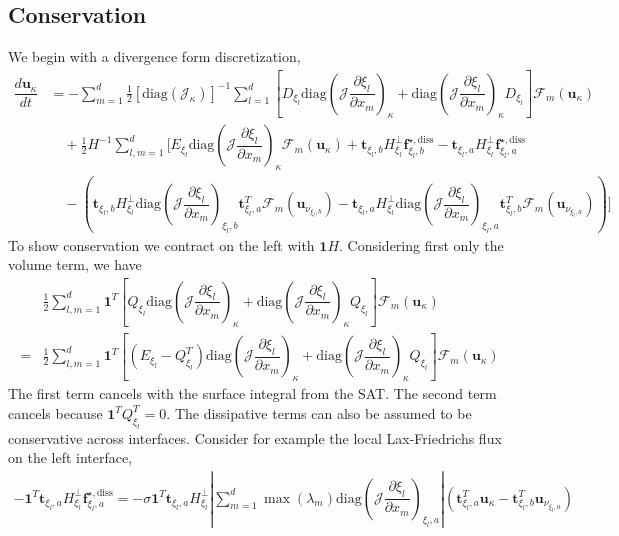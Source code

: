 \documentclass[12pt,a4paper]{article}
\newcommand{\pder}[2][]{\dfrac{\partial #1}{\partial #2}} %
\newcommand{\der}[2][]{\dfrac{d #1}{d #2}} %
\newcommand{\fn}[1]{\mathcal{#1}} %
\newcommand{\fnb}[1]{\bm{\mathcal{#1}}} %
\begin{document}
\subsection{Conservation}

We begin with a divergence form discretization,
\begin{align*}
\der[\bm{u}_\kappa]{t} &= - \sum_{m=1}^d \frac{1}{2} \left[ \text{diag}\left( \fn{J}_\kappa \right) \right]^{-1} \sum_{l=1}^d \left[ D_{\xi_l} \text{diag} \left( \fn{J} \pder[\xi_l]{x_m} \right)_\kappa + \text{diag} \left( \fn{J} \pder[\xi_l]{x_m} \right)_\kappa  D_{\xi_l} \right]  \fnb{F}_m \left( \bm{u}_\kappa \right) \\
& \quad + \frac{1}{2} H^{-1} \sum_{l,m = 1}^d \Bigg[ E_{\xi_l} \text{diag} \left( \fn{J} \pder[\xi_l]{x_m} \right)_\kappa \fnb{F}_m ( \bm{u}_\kappa) +  \bm{t}_{\xi_l,b} H^{\bot}_{\xi_l} \bm{f}^{\star , \text{diss}}_{\xi_l,b}  - \bm{t}_{\xi_l,a} H^{\bot}_{\xi_l} \bm{f}^{\star , \text{diss}}_{\xi_l,a}   \\
& \quad - \left( \bm{t}_{\xi_l,b} H^{\bot}_{\xi_l} \text{diag} \left( \fn{J} \pder[\xi_l]{x_m} \right)_{\xi_l,b} \bm{t}^T_{\xi_l,a}  \fnb{F}_m ( \bm{u}_{\nu_{\xi_l,b}} ) - \bm{t}_{\xi_l,a} H^{\bot}_{\xi_l} \text{diag} \left( \fn{J} \pder[\xi_l]{x_m} \right)_{\xi_l,a} \bm{t}_{\xi_l,b}^T  \fnb{F}_m ( \bm{u}_{\nu_{\xi_l,a}} ) \right) \Bigg]
\end{align*} 
To show conservation we contract on the left with $\bm{1} H$. Considering first only the volume term, we have
\begin{align*}
& \frac{1}{2} \sum_{l,m=1}^d \bm{1}^T  \left[ Q_{\xi_l} \text{diag} \left( \fn{J} \pder[\xi_l]{x_m} \right)_\kappa + \text{diag} \left( \fn{J} \pder[\xi_l]{x_m} \right)_\kappa  Q_{\xi_l} \right] \fnb{F}_m \left( \bm{u}_\kappa \right) \\
 = & \frac{1}{2} \sum_{l,m=1}^d \bm{1}^T  \left[ \left( E_{\xi_l} - Q_{\xi_l}^T \right) \text{diag} \left( \fn{J} \pder[\xi_l]{x_m} \right)_\kappa + \text{diag} \left( \fn{J} \pder[\xi_l]{x_m} \right)_\kappa  Q_{\xi_l} \right] \fnb{F}_m \left( \bm{u}_\kappa \right) 
\end{align*}
The first term cancels with the surface integral from the SAT. The second term cancels because $\bm{1}^T Q_{\xi_l}^T= 0$. The dissipative terms can also be assumed to be conservative across interfaces. Consider for example the local Lax-Friedrichs flux on the left interface,
\begin{align*}
- \bm{1}^T \bm{t}_{\xi_l,a} H^{\bot}_{\xi_l} \bm{f}^{\star , \text{diss}}_{\xi_l,a} = - \sigma \bm{1}^T \bm{t}_{\xi_l,a} H^{\bot}_{\xi_l} \left\vert \sum_{m=1}^d \max (\lambda_m) \text{diag} \left( \fn{J} \pder[\xi_l]{x_m} \right)_{\xi_l,a} \right\vert \left( \bm{t}^T_{\xi_l,a} \bm{u}_\kappa - \bm{t}^T_{\xi_l,b} \bm{u}_{\nu_{\xi_l,a}}  \right)
\end{align*}
\end{document}
